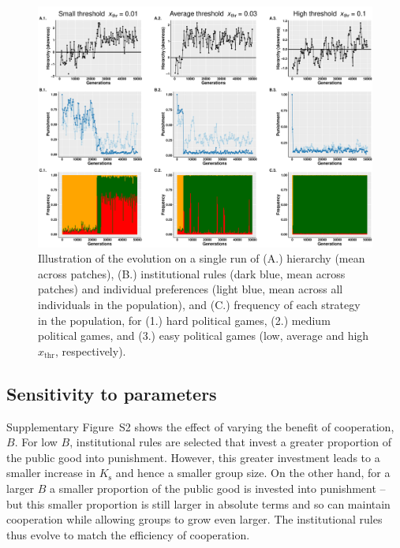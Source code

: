 \documentclass{rstb}
\begin{document}
\begin{linenumbers}
\begin{figure}
    \centering
    \includegraphics[width=0.8\linewidth]{Figures/pt_gen_xThr.pdf}
    \caption{Illustration of the evolution on a single run of (A.) hierarchy (mean across patches), (B.) institutional rules (dark blue, mean across patches) and individual preferences (light blue, mean across all individuals in the population), and (C.) frequency of each strategy in the population, for (1.) hard political games, (2.) medium political games, and (3.) easy political games (low, average and high $x_\mathrm{thr}$, respectively).}
    \label{figGen_xThr}
\end{figure}

\subsection{Sensitivity to parameters}
Supplementary Figure~S2 shows the effect of varying the benefit of cooperation, $B$. For low $B$, institutional rules are selected that invest a greater proportion of the public good into punishment. However, this greater investment leads to a smaller increase in $K_{\mathrm{s}}$ and hence a smaller group size. On the other hand, for a larger $B$ a smaller proportion of the public good is invested into punishment -- but this smaller proportion is still larger in absolute terms and so can maintain cooperation while allowing groups to grow even larger. The institutional rules thus evolve to match the efficiency of cooperation.


\end{linenumbers}
\end{document}
